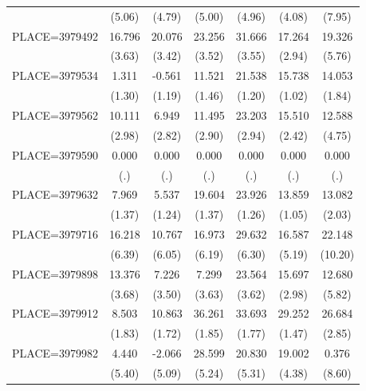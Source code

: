 {\begin{tabular}{l*{6}{c}}
                    &      (5.06)&      (4.79)&      (5.00)&      (4.96)&      (4.08)&      (7.95)\\
PLACE=3979492       &      16.796&      20.076&      23.256&      31.666&      17.264&      19.326\\
                    &      (3.63)&      (3.42)&      (3.52)&      (3.55)&      (2.94)&      (5.76)\\
PLACE=3979534       &       1.311&      -0.561&      11.521&      21.538&      15.738&      14.053\\
                    &      (1.30)&      (1.19)&      (1.46)&      (1.20)&      (1.02)&      (1.84)\\
PLACE=3979562       &      10.111&       6.949&      11.495&      23.203&      15.510&      12.588\\
                    &      (2.98)&      (2.82)&      (2.90)&      (2.94)&      (2.42)&      (4.75)\\
PLACE=3979590       &       0.000&       0.000&       0.000&       0.000&       0.000&       0.000\\
                    &         (.)&         (.)&         (.)&         (.)&         (.)&         (.)\\
PLACE=3979632       &       7.969&       5.537&      19.604&      23.926&      13.859&      13.082\\
                    &      (1.37)&      (1.24)&      (1.37)&      (1.26)&      (1.05)&      (2.03)\\
PLACE=3979716       &      16.218&      10.767&      16.973&      29.632&      16.587&      22.148\\
                    &      (6.39)&      (6.05)&      (6.19)&      (6.30)&      (5.19)&     (10.20)\\
PLACE=3979898       &      13.376&       7.226&       7.299&      23.564&      15.697&      12.680\\
                    &      (3.68)&      (3.50)&      (3.63)&      (3.62)&      (2.98)&      (5.82)\\
PLACE=3979912       &       8.503&      10.863&      36.261&      33.693&      29.252&      26.684\\
                    &      (1.83)&      (1.72)&      (1.85)&      (1.77)&      (1.47)&      (2.85)\\
PLACE=3979982       &       4.440&      -2.066&      28.599&      20.830&      19.002&       0.376\\
                    &      (5.40)&      (5.09)&      (5.24)&      (5.31)&      (4.38)&      (8.60)\\

\end{tabular}}
